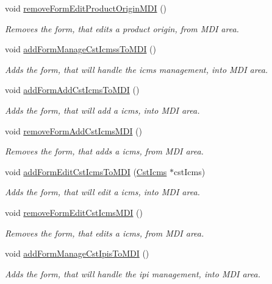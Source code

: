 \begin{DoxyCompactItemize}
void \hyperlink{class_main_window_a07c2bf04aedb01e78aa7adb839f93d16}{remove\-Form\-Edit\-Product\-Origin\-M\-D\-I} ()
\begin{DoxyCompactList}\small\item\em \-Removes the form, that edits a product origin, from \-M\-D\-I area. \end{DoxyCompactList}\item 
void \hyperlink{class_main_window_ad93a726211da522ee587b09be724a286}{add\-Form\-Manage\-Cst\-Icmss\-To\-M\-D\-I} ()
\begin{DoxyCompactList}\small\item\em \-Adds the form, that will handle the icms management, into \-M\-D\-I area. \end{DoxyCompactList}\item 
void \hyperlink{class_main_window_a716a1e7dcb604c0368f1a4a19f17a68b}{add\-Form\-Add\-Cst\-Icms\-To\-M\-D\-I} ()
\begin{DoxyCompactList}\small\item\em \-Adds the form, that will add a icms, into \-M\-D\-I area. \end{DoxyCompactList}\item 
void \hyperlink{class_main_window_ad17a9c223d3de47ef2995736089c7cb7}{remove\-Form\-Add\-Cst\-Icms\-M\-D\-I} ()
\begin{DoxyCompactList}\small\item\em \-Removes the form, that adds a icms, from \-M\-D\-I area. \end{DoxyCompactList}\item 
void \hyperlink{class_main_window_acc468571f806592024d195fb4e40ffb6}{add\-Form\-Edit\-Cst\-Icms\-To\-M\-D\-I} (\hyperlink{class_cst_icms}{\-Cst\-Icms} $\ast$cst\-Icms)
\begin{DoxyCompactList}\small\item\em \-Adds the form, that will edit a icms, into \-M\-D\-I area. \end{DoxyCompactList}\item 
void \hyperlink{class_main_window_a9f30febeaa3549bef7a1a299aa5344d7}{remove\-Form\-Edit\-Cst\-Icms\-M\-D\-I} ()
\begin{DoxyCompactList}\small\item\em \-Removes the form, that edits a icms, from \-M\-D\-I area. \end{DoxyCompactList}\item 
void \hyperlink{class_main_window_accd554fe78a90bf3154199b9b89b71ee}{add\-Form\-Manage\-Cst\-Ipis\-To\-M\-D\-I} ()
\begin{DoxyCompactList}\small\item\em \-Adds the form, that will handle the ipi management, into \-M\-D\-I area. \end{DoxyCompactList}\item 

\end{DoxyCompactItemize}
